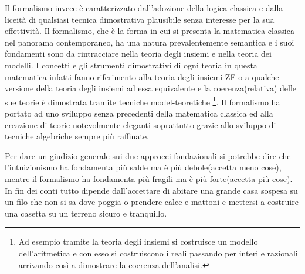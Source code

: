 Il formalismo invece è caratterizzato dall'adozione della logica classica
e dalla liceità di qualsiasi tecnica dimostrativa plausibile senza
interesse per la sua effettività. Il formalismo, che è la forma in
cui si presenta la matematica classica nel panorama contemporaneo,
ha una natura prevalentemente semantica e i suoi fondamenti sono da
rintracciare nella teoria degli insiemi e nella teoria dei modelli.
I concetti e gli strumenti dimostrativi di ogni teoria in questa matematica
infatti fanno riferimento alla teoria degli insiemi ZF o a qualche
versione della teoria degli insiemi ad essa equivalente e la coerenza(relativa)
delle sue teorie è dimostrata tramite tecniche model-teoretiche%
\footnote{Ad esempio tramite la teoria degli insiemi si costruisce un modello
dell'aritmetica e con esso si costruiscono i reali passando per interi
e razionali arrivando così a dimostrare la coerenza dell'analisi.%
}. Il formalismo ha portato ad uno sviluppo senza precedenti della
matematica classica ed alla creazione di teorie notevolmente eleganti
soprattutto grazie allo sviluppo di tecniche algebriche sempre più
raffinate. 

Per dare un giudizio generale sui due approcci fondazionali si potrebbe
dire che l'intuizionismo ha fondamenta più salde ma è più debole(accetta
meno cose), mentre il formalismo ha fondamenta più fragili ma è più
forte(accetta più cose). In fin dei conti tutto dipende dall'accettare
di abitare una grande casa sospesa su un filo che non si sa dove poggia
o prendere calce e mattoni e mettersi a costruire una casetta su un
terreno sicuro e tranquillo.

